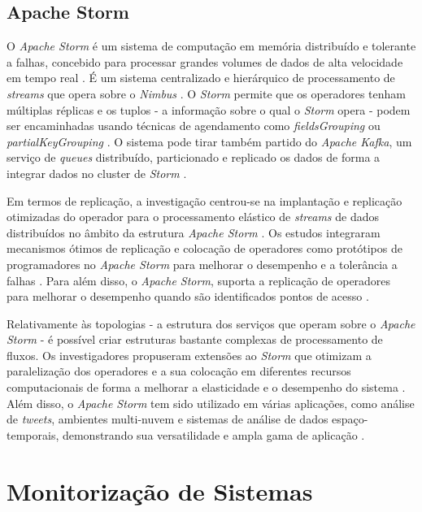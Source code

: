 \subsection{Apache Storm}

O \textit{Apache Storm} é um sistema de computação em memória distribuído e tolerante a falhas, 
concebido para processar grandes volumes de dados de alta velocidade em tempo real \cite{storm2017}. 
É um sistema centralizado e hierárquico de processamento de \textit{streams} que opera sobre o 
\textit{Nimbus} \cite{storm2015}. O \textit{Storm} permite que os operadores tenham múltiplas 
réplicas e os tuplos - a informação sobre o qual o \textit{Storm} opera - podem ser encaminhadas 
usando técnicas de agendamento como \textit{fieldsGrouping} ou \textit{partialKeyGrouping}
\cite{storm2018}. O sistema pode tirar também partido do \textit{Apache Kafka}, um serviço de 
\textit{queues} distribuído, particionado e replicado os dados de forma a integrar dados no 
\gls{cluster} de \textit{Storm} \cite{storm2018b}.

Em termos de replicação, a investigação centrou-se na implantação e replicação otimizadas do 
operador para o processamento elástico de \textit{streams} de dados distribuídos no âmbito 
da estrutura \textit{Apache Storm} \cite{storm2017b}. Os estudos integraram mecanismos ótimos de
replicação e colocação de operadores como protótipos de programadores no \textit{Apache Storm} para
melhorar o desempenho e a tolerância a falhas \cite{storm2017c}. Para além disso, o 
\textit{Apache Storm}, suporta a replicação de operadores para melhorar o desempenho quando são 
identificados pontos de acesso \cite{storm2018c}.

Relativamente às topologias - a estrutura dos serviços que operam sobre o \textit{Apache Storm} - 
é possível criar estruturas bastante complexas de processamento de fluxos. Os investigadores 
propuseram extensões ao \textit{Storm} que otimizam a paralelização dos operadores e a sua 
colocação em diferentes recursos computacionais de forma a melhorar a elasticidade e o desempenho 
do sistema \cite{storm2017d} . Além disso, o \textit{Apache Storm} tem sido utilizado em várias 
aplicações, como análise de \textit{tweets}, ambientes multi-nuvem e sistemas de análise de dados 
espaço-temporais, demonstrando sua versatilidade e ampla gama de aplicação \cite{storm2018d} 
\cite{storm2020} \cite{storm2021}.

\section{Monitorização de Sistemas}

